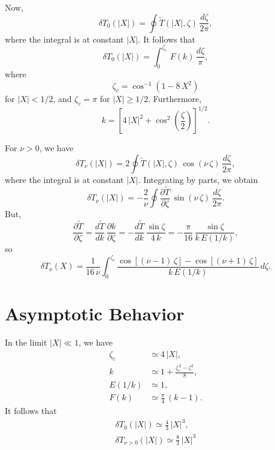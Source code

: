\documentclass[12pt,prb,aps,notitlepage]{revtex4-1}
\begin{document}
Now,
\begin{equation}
\delta T_0(|X|) = \oint\tilde{T}(|X|,\zeta)\,\frac{d\zeta}{2\pi},
\end{equation}
where the integral is at constant $|X|$. It follows that
\begin{equation}
\delta T_0(|X|) =  \int_0^{\zeta_c}\,F(k)\,\frac{d\zeta}{\pi},
\end{equation}
where 
\begin{equation}
\zeta_c = \cos^{-1}\left(1-8\,X^2\right)
\end{equation}
for $|X|< 1/2$, and $\zeta_c=\pi$ for $|X|\geq 1/2$. Furthermore, 
\begin{equation}
k = \left[4\,|X|^2+\cos^2\left(\frac{\zeta}{2}\right)\right]^{1/2}.
\end{equation}

For $\nu>0$, we have
\begin{equation}
\delta T_\nu(|X|) = 2\oint \tilde{T}(|X|,\zeta)\,\cos(\nu\,\zeta)\,\frac{d\zeta}{2\pi},
\end{equation}
where the integral is at constant $|X|$. Integrating by parts, we obtain
\begin{equation}
\delta T_\nu(|X|) =-\frac{2}{\nu}\oint\frac{\partial\tilde{T}}{\partial \zeta}\,\sin(\nu\,\zeta)\,\frac{d\zeta}{2\pi}.
\end{equation}
But,
\begin{equation}
\frac{\partial\tilde{T}}{\partial \zeta}=\frac{d\tilde{T}}{dk}\,\frac{\partial k}{\partial\zeta}=-\frac{d\tilde{T}}{dk}\,\frac{\sin\zeta}{4\,k} = -\frac{\pi}{16}\,\frac{\sin\zeta}{k\,E(1/k)},
\end{equation}
so
\begin{equation}
\delta T_\nu(X) =\frac{1}{16\,\nu} \int_0^{\zeta_c}\frac{\cos[(\nu-1)\,\zeta]-\cos[(\nu+1)\,\zeta]}{k\,E(1/k)}\,d\zeta.
\end{equation}

\section{Asymptotic Behavior}
In the limit $|X| \ll 1$, we have
\begin{align}
\zeta_c &\simeq 4\,|X|,\\[0.5ex]
k &\simeq 1 + \frac{\zeta_c^{\,2}-\zeta^2}{8},\\[0.5ex]
E(1/k)&\simeq 1,\\[0.5ex]
F(k)&\simeq \frac{\pi}{4}\,(k-1).
\end{align}
It follows that
\begin{align}
\delta T_0(|X|) \simeq \frac{4}{3}\,|X|^3,\\[0.5ex]
\delta T_{\nu>0}(|X|) \simeq \frac{8}{3}\,|X|^3
\end{align}
\end{document}
